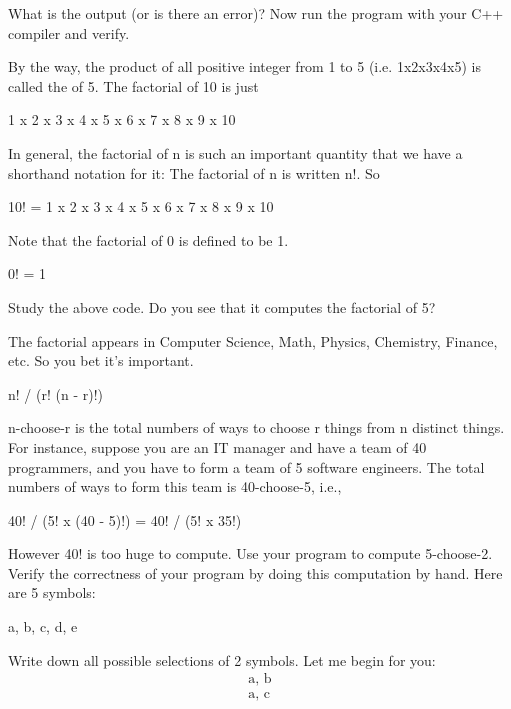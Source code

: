 
What is the output (or is there an error)? Now run the program with your
C++ compiler and verify.

By the way, the product of all positive integer from 1 to 5 (i.e.
1x2x3x4x5) is called the  of 5. The factorial of 10 is
just
\begin{center}
1 x 2 x 3 x 4 x 5 x 6 x 7 x 8 x 9 x 10
\end{center}
In general, the factorial of n is such an important quantity that we
have a shorthand notation for it: The factorial of n is written n!. So
\begin{center}
10! = 1 x 2 x 3 x 4 x 5 x 6 x 7 x 8 x 9 x 10
\end{center}
Note that the factorial of 0 is defined to be 1.
\begin{center}
0! = 1
\end{center}
Study the above code. Do you see that it computes the factorial of 5?

The factorial appears in Computer Science, Math, Physics, Chemistry,
Finance, etc. So you bet it's important.





\begin{center}
n! / (r! (n - r)!)
\end{center}
n-choose-r is the total numbers of ways to choose r things from n
distinct things. For instance, suppose you are an IT manager and have a
team of 40 programmers, and you have to form a team of 5 software
engineers. The total numbers of ways to form this team is 40-choose-5,
i.e.,
\begin{center}
40! / (5! x (40 - 5)!) = 40! / (5! x 35!)
\end{center}
However 40! is too huge to compute. Use your program to compute
5-choose-2. Verify the correctness of your program by doing this
computation by hand. Here are 5 symbols:

\begin{center}
a, b, c, d, e
\end{center}
Write down all possible selections of 2 symbols. Let me begin for you:
\begin{align*}
\text{a, b}\\
\text{a, c}
\end{align*}

